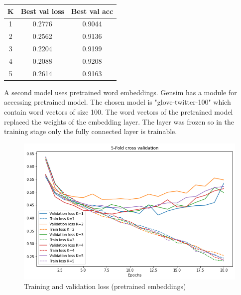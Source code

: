 \documentclass[11pt]{article}
\begin{document}
  \begin{center}
\begin{tabular}{||c c c||}
 \hline
 K & Best val loss & Best val acc \\ [0.5ex]
 \hline\hline
 1 & 0.2776 & 0.9044 \\
 \hline
 2 & 0.2562 & 0.9136 \\
 \hline
 3 & 0.2204 & 0.9199 \\
 \hline
 4 & 0.2088 & 0.9208 \\
 \hline
 5 & 0.2614 & 0.9163 \\ [1ex]
 \hline
\end{tabular}
\end{center}

    A second model uses pretrained word embeddings.
    Gensim has a module for accessing pretrained model.
    The chosen model is "glove-twitter-100" which contain word vectors of size 100.
    The word vectors of the pretrained model replaced the weights of the embedding layer.
    The layer was frozen so in the training stage only the fully connected layer is trainable.

\begin{figure}[h!]
  \includegraphics[width=\columnwidth]{train_loss_hashtags_pretrained}
  \caption{Training and validation loss (pretrained embeddings)}\label{fig:figure4}
\end{figure}
\end{document}
